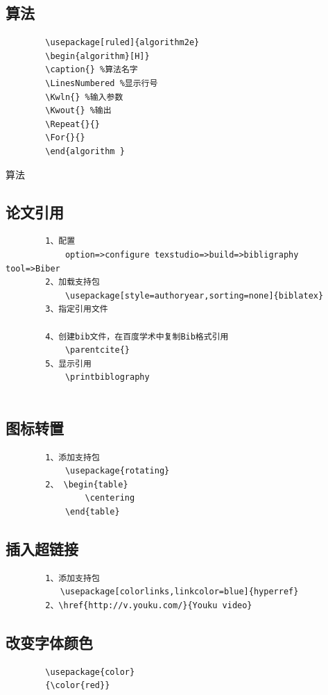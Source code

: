 \documentclass[a4paper]{article}
\begin{document}
	\subsection{算法}
	\begin{lstlisting}
		\usepackage[ruled]{algorithm2e}
		\begin{algorithm}[H]}
		\caption{} %算法名字
		\LinesNumbered %显示行号
		\Kwln{} %输入参数
		\Kwout{} %输出
		\Repeat{}{}
		\For{}{}
		\end{algorithm }
	\end{lstlisting}
	\begin{algorithm}[H]
		\caption{算法}
		\LinesNumbered
	\end{algorithm}

	\subsection{论文引用}
	\begin{lstlisting}
		1、配置
			option=>configure texstudio=>build=>bibligraphy tool=>Biber
		2、加载支持包
			\usepackage[style=authoryear,sorting=none]{biblatex}
		3、指定引用文件
			
		4、创建bib文件，在百度学术中复制Bib格式引用
			\parentcite{}
		5、显示引用
			\printbiblography
			
	\end{lstlisting}
	\subsection{图标转置}
	\begin{lstlisting}
		1、添加支持包
			\usepackage{rotating}
		2、 \begin{table}
				\centering
			\end{table}
	\end{lstlisting}
	\subsection{插入超链接}
	\begin{lstlisting}
		1、添加支持包
		   \usepackage[colorlinks,linkcolor=blue]{hyperref}
		2、\href{http://v.youku.com/}{Youku video} 
	\end{lstlisting}
	\subsection{改变字体颜色}
	\begin{lstlisting}
		\usepackage{color}
		{\color{red}}
	\end{lstlisting}
\end{document}
